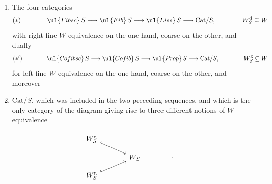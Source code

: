 \begin{enumerate}[label={}]
\item[$1^{o}$)] The four categories
\[(*) \qquad\qquad \ul{Fibsc}\,S \longrightarrow \ul{Fib}\,S \longrightarrow \ul{Liss}\,S \longrightarrow \mathrm{Cat}/S, \qquad\qquad W_S^{\mathrm{d}} \subseteq W\]
with right fine $W$-equivalence on the one hand, coarse on the other, and dually
\[(*') \qquad\qquad \ul{Cofibsc}\,S \longrightarrow \ul{Cofib}\,S \longrightarrow \ul{Prop}\,S \longrightarrow \mathrm{Cat}/S, \qquad\qquad W_S^{\mathrm{g}} \subseteq W\]
for left fine $W$-equivalence on the one hand, coarse on the other, and moreover
\item[$2^{o}$)] $\mathrm{Cat}/S$, which was included in the two preceding sequences, and which is the only category of the diagram giving rise to three different notions of $W$-equivalence %
\end{enumerate}

\[
\begin{tikzcd}[row sep=small, column sep=large]
W_S^{\mathrm{d}} \arrow[dr, hook] & \\
& W_S \\
W_S^{\mathrm{g}} \arrow[ur, hook] &
\end{tikzcd}
\qquad\qquad .
\]


